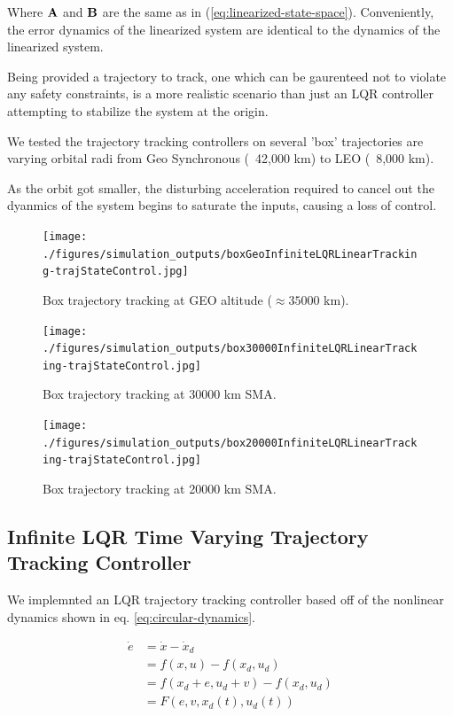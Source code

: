 \documentclass[conference]{IEEEtran}
\begin{document}
Where ${\bf A}$ and ${\bf B}$ are the same as in
(\ref{eq:linearized-state-space}). Conveniently, the error dynamics of the
linearized system are identical to the dynamics of the linearized system.

Being provided a trajectory to track, one which can be gaurenteed not to
violate any safety constraints, is a more realistic scenario than just an LQR
controller attempting to stabilize the system at the origin.

We tested the trajectory tracking controllers on several 'box' trajectories are
varying orbital radi from Geo Synchronous (~42,000 km) to LEO (~8,000 km).

As the orbit got smaller, the disturbing acceleration required to cancel out
the dyanmics of the system begins to saturate the inputs, causing a loss of
control.

\begin{figure}[t]
    \centerline{\texttt{[image: ./figures/simulation\_outputs/boxGeoInfiniteLQRLinearTracking-trajStateControl.jpg]}}
    \caption{Box trajectory tracking at GEO altitude ($\approx 35000$ km).}
    \label{fig:boxGEO}
\end{figure}

\begin{figure}[t]
    \centerline{\texttt{[image: ./figures/simulation\_outputs/box30000InfiniteLQRLinearTracking-trajStateControl.jpg]}}
    \caption{Box trajectory tracking at 30000 km SMA.}
    \label{fig:box30000}
\end{figure}

\begin{figure}[t]
    \centerline{\texttt{[image: ./figures/simulation\_outputs/box20000InfiniteLQRLinearTracking-trajStateControl.jpg]}}
    \caption{Box trajectory tracking at 20000 km SMA.}
    \label{fig:box2000}
\end{figure}


\subsection{Infinite LQR Time Varying Trajectory Tracking Controller}

We implemnted an LQR trajectory tracking controller based off of the nonlinear
dynamics shown in eq. \ref{eq:circular-dynamics}.

\begin{equation}
    \label{eq:nonlinear-error-dynamics}
    \begin{split}
        \dot{e} & = \dot{x} - \dot{x}_d \\
                & = f(x, u) - f(x_d, u_d) \\
                & = f(x_d + e, u_d + v) - f(x_d, u_d) \\
                & = F(e, v, x_d(t), u_d(t))
    \end{split}
\end{equation}
\end{document}
